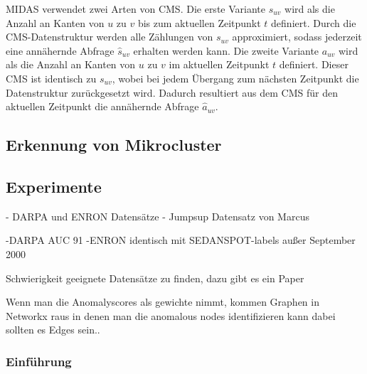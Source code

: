 MIDAS verwendet zwei Arten von CMS. Die erste Variante $s_{uv}$ wird als die Anzahl an Kanten von $u$ zu $v$ bis zum aktuellen Zeitpunkt $t$ definiert. Durch die CMS-Datenstruktur werden alle Zählungen von $s_{uv}$ approximiert, sodass jederzeit eine annähernde Abfrage $\hat{s}_{uv}$ erhalten werden kann.
Die zweite Variante $a_{uv}$ wird als die Anzahl an Kanten  von $u$ zu $v$ im aktuellen Zeitpunkt $t$ definiert. Dieser CMS ist identisch zu $s_{uv}$, wobei bei jedem Übergang zum nächsten Zeitpunkt die Datenstruktur zurückgesetzt wird. Dadurch resultiert aus dem CMS für den aktuellen Zeitpunkt die annähernde Abfrage $\hat{a}_{uv}$. \citep[vgl.][S.~3]{MIDAS}




\subsection{Erkennung von Mikrocluster}
\label{sec:mc-gl-dm}


\subsection{Experimente}
\label{sec:m-ex}
- DARPA und ENRON Datensätze
- Jumpsup Datensatz von Marcus

-DARPA AUC 91%
-ENRON identisch mit SEDANSPOT-labels außer September 2000

Schwierigkeit geeignete Datensätze zu finden, dazu gibt es ein Paper

Wenn man die Anomalyscores als gewichte nimmt, kommen Graphen in Networkx raus in denen man die anomalous nodes identifizieren kann dabei sollten es Edges sein..

\subsubsection{Einführung}
\label{sec:mc-gl-cms-in}


